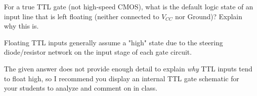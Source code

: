 

For a true TTL gate (not high-speed CMOS), what is the default logic state of an input line that is left floating (neither connected to $V_{CC}$ nor Ground)?  Explain why this is.







Floating TTL inputs generally assume a "high" state due to the steering diode/resistor network on the input stage of each gate circuit.







The given answer does not provide enough detail to explain {\it why} TTL inputs tend to float high, so I recommend you display an internal TTL gate schematic for your students to analyze and comment on in class.




